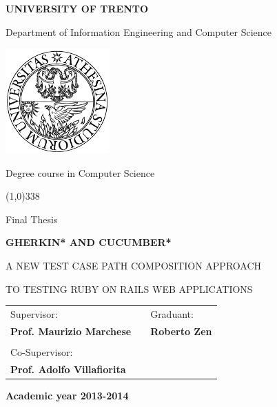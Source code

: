 \begin{titlepage}
	\pagestyle{empty}

	\begin{center}
		{\bfseries\Large {\huge U}NIVERSITY OF {\huge T}RENTO}

		\vspace{0.2cm}

		{\large Department of Information Engineering and Computer Science}

		\vspace{0.5cm}

		\begin{center}
			\includegraphics[width=0.3\textwidth]{img/unitn}
		\end{center}

		\vspace{0.5cm}

		{\Large Degree course in Computer Science}

		\vspace{0.2cm}
		\line(1,0){338}
		\vspace{0.5cm}

		{\Large Final Thesis}

		\vspace{2.0cm}

		{\Large \bfseries {{\huge G}HERKIN* AND {\huge C}UCUMBER*}}

		\vspace{0.3cm}
		
		{\large \textsc{A NEW TEST CASE PATH COMPOSITION APPROACH}}
		\vspace{0.3cm}
		
		{\large \textsc{TO TESTING RUBY ON RAILS WEB APPLICATIONS}}

		\vspace{2.0cm}

		\large
		\begin{center}
			\begin{tabular}{lcl}
				Supervisor: & \hspace{5cm} &  Graduant: \\
				{\bfseries Prof. Maurizio Marchese} & \hspace{5cm} & {\bfseries Roberto Zen} \\ \\
				Co-Supervisor: \\ {\bfseries Prof. Adolfo Villafiorita}
			\end{tabular}
		\end{center}
		\vspace{2.0cm}

		{\large \bfseries Academic year 2013-2014}
		\vfill

	\end{center}

\end{titlepage}
